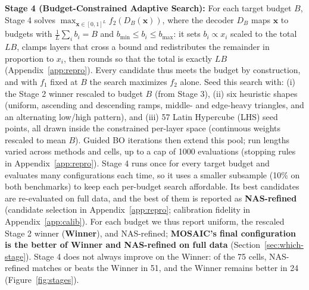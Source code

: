 \documentclass[11pt]{article}
\begin{document}
\begin{table}[htbp]
  \centering
  \scriptsize
  \setlength{\tabcolsep}{2.6pt}
  \renewcommand{\arraystretch}{0.92}
  
  \caption{\textbf{One search, many budgets.} Stage 3: the Stage 2 winner, found once at its natural average budget and rescaled to every target budget with no further search. Stage 4: NAS-refined, the best configuration of the budget-constrained search, available only at budgets where it ran. MOSAIC: its final configuration, the better of Winner and NAS-refined (chosen per budget), at the same budgets as Stage 4. Wins: budgets where the configuration beats uniform on full data; $\Delta$: mean gain over uniform. $^\ddagger$Mistral-7B-Instruct-v0.2; all other rows Llama-3-8B-Instruct.}
  \label{tab:transfer}
\end{table}

\textbf{Stage 4 (Budget-Constrained Adaptive Search):} For each target budget $B$, Stage 4 solves $\max_{\mathbf{x} \in [0,1]^L} f_2(D_B(\mathbf{x}))$, where the decoder $D_B$ maps $\mathbf{x}$ to budgets with $\frac{1}{L}\sum_i b_i = B$ and $b_{\min} \le b_i \le b_{\max}$: it sets $b_i \propto x_i$ scaled to the total $LB$, clamps layers that cross a bound and redistributes the remainder in proportion to $x_i$, then rounds so that the total is exactly $LB$ (Appendix~\ref{app:repro}). Every candidate thus meets the budget by construction, and with $f_1$ fixed at $B$ the search maximizes $f_2$ alone. Seed this search with: (i) the Stage 2 winner rescaled to budget $B$ (from Stage 3), (ii) six heuristic shapes (uniform, ascending and descending ramps, middle- and edge-heavy triangles, and an alternating low/high pattern), and (iii) 57 Latin Hypercube (LHS) seed points, all drawn inside the constrained per-layer space (continuous weights rescaled to mean $B$). Guided BO iterations then extend this pool; run lengths varied across methods and cells, up to a cap of 1000 evaluations (stopping rules in Appendix~\ref{app:repro}). Stage 4 runs once for every target budget and evaluates many configurations each time, so it uses a smaller subsample (10\% on both benchmarks) to keep each per-budget search affordable. Its best candidates are re-evaluated on full data, and the best of them is reported as \textbf{NAS-refined} (candidate selection in Appendix~\ref{app:repro}; calibration fidelity in Appendix~\ref{app:calib}). For each budget we thus report uniform, the rescaled Stage 2 winner (\textbf{Winner}), and NAS-refined; \textbf{MOSAIC's final configuration is the better of Winner and NAS-refined on full data} (Section~\ref{sec:which-stage}). Stage 4 does not always improve on the Winner: of the 75 cells, NAS-refined matches or beats the Winner in 51, and the Winner remains better in 24 (Figure~\ref{fig:stages}).
\end{document}
